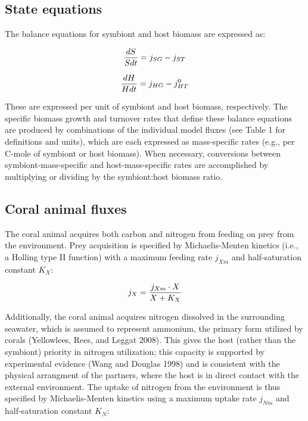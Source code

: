 \documentclass[]{elsarticle} %
\begin{document}
\subsection{State equations}\label{state-equations}

The balance equations for symbiont and host biomass are expressed as:

\begin{equation} {dS \over Sdt} = j_{SG} - j_{ST} \end{equation}

\begin{equation} {dH \over Hdt} = j_{HG} - j_{HT}^0 \end{equation}

These are expressed per unit of symbiont and host biomass, respectively.
The specific biomass growth and turnover rates that define these balance
equations are produced by combinations of the individual model fluxes
(see Table 1 for definitions and units), which are each expressed as
mass-specific rates (e.g., per C-mole of symbiont or host biomass). When
necessary, conversions between symbiont-mass-specific and
host-mass-specific rates are accomplished by multiplying or dividing by
the symbiont:host biomass ratio.

\subsection{Coral animal fluxes}\label{coral-animal-fluxes}

The coral animal acquires both carbon and nitrogen from feeding on prey
from the environment. Prey acquisition is specified by Michaelis-Menten
kinetics (i.e., a Holling type II function) with a maximum feeding rate
\(j_{Xm}\) and half-saturation constant \(K_X\):

\begin{equation} j_X = {{j_{Xm} \cdot X} \over {X + K_X}} \end{equation}

Additionally, the coral animal acquires nitrogen dissolved in the
surrounding seawater, which is assumed to represent ammonium, the
primary form utilized by corals (Yellowlees, Rees, and Leggat 2008).
This gives the host (rather than the symbiont) priority in nitrogen
utilization; this capacity is supported by experimental evidence (Wang
and Douglas 1998) and is consistent with the physical arrangment of the
partners, where the host is in direct contact with the external
environment. The uptake of nitrogen from the environment is thus
specified by Michaelis-Menten kinetics using a maximum uptake rate
\(j_{Nm}\) and half-saturation constant \(K_N\):
\end{document}
